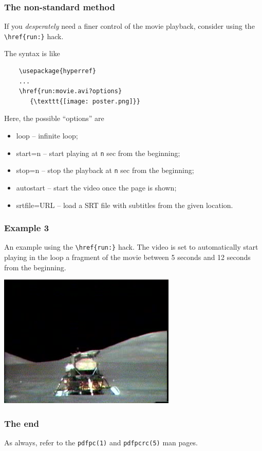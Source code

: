 \documentclass{beamer}
\newcommand{\opt}[1]{\texttt{#1}\xspace}
\begin{document}
\begin{frame}[fragile]
  \frametitle{The non-standard method}

  If you {\em desperately} need a finer control of the movie playback, consider
  using the \opt{\textbackslash href\{run:\}} hack.

  The syntax is like

  \begin{lstlisting}
    \usepackage{hyperref}
    ...
    \href{run:movie.avi?options}
       {\texttt{[image: poster.png]}}
  \end{lstlisting}

  Here, the possible ``options'' are
  \begin{itemize}
    \item loop -- infinite loop;
    \item start=n -- start playing at \opt{n} sec from the beginning;
    \item stop=n -- stop the playback at \opt{n} sec from the beginning;
    \item autostart -- start the video once the page is shown;
    \item srtfile=URL -- load a SRT file with subtitles from the given
      location.
  \end{itemize}

\end{frame}

\begin{frame}
  \frametitle{Example 3}

  An example using the \opt{\textbackslash href\{run:\}} hack. The
  video is set to automatically start playing in the loop a fragment of the
  movie between 5 seconds and 12 seconds from the beginning.

  \vspace{5pt}

  \begin{center}
    \href{run:apollo17.avi?autostart&loop&start=5&stop=12}
       {\includegraphics[height=0.7\textheight]{apollo17.jpg}}
  \end{center}
\end{frame}

\begin{frame}
  \frametitle{The end}
  
  As always, refer to the \opt{pdfpc(1)} and \opt{pdfpcrc(5)} man pages.

\end{frame}
\end{document}
